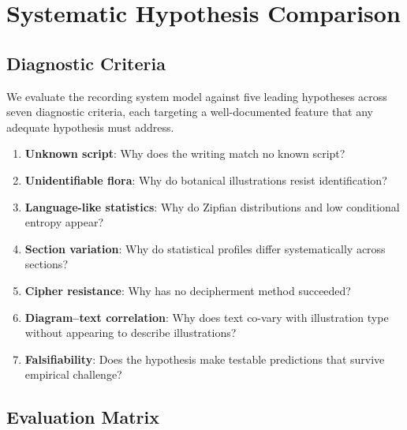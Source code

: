 \documentclass[11pt,a4paper,twocolumn]{article}
\begin{document}
\section{Systematic Hypothesis Comparison}
\label{sec:comparison}

\subsection{Diagnostic Criteria}

We evaluate the recording system model against five leading hypotheses across seven diagnostic criteria, each targeting a well-documented feature that any adequate hypothesis must address.

\begin{enumerate}[leftmargin=*,itemsep=2pt]
    \item[\textbf{C1}] \textbf{Unknown script}: Why does the writing match no known script?
    \item[\textbf{C2}] \textbf{Unidentifiable flora}: Why do botanical illustrations resist identification?
    \item[\textbf{C3}] \textbf{Language-like statistics}: Why do Zipfian distributions and low conditional entropy appear?
    \item[\textbf{C4}] \textbf{Section variation}: Why do statistical profiles differ systematically across sections?
    \item[\textbf{C5}] \textbf{Cipher resistance}: Why has no decipherment method succeeded?
    \item[\textbf{C6}] \textbf{Diagram--text correlation}: Why does text co-vary with illustration type without appearing to describe illustrations?
    \item[\textbf{C7}] \textbf{Falsifiability}: Does the hypothesis make testable predictions that survive empirical challenge?
\end{enumerate}

\subsection{Evaluation Matrix}
\end{document}
